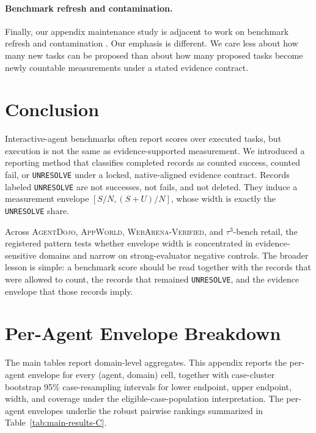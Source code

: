 \documentclass{article}
\newcommand{\agentdojo}{\textsc{AgentDojo}\xspace}
\newcommand{\appworld}{\textsc{AppWorld}\xspace}
\newcommand{\webarena}{\textsc{WebArena-Verified}\xspace}
\newcommand{\tauthree}{\(\tau^3\)-bench retail\xspace}
\begin{document}
\paragraph{Benchmark refresh and contamination.}
Finally, our appendix maintenance study is adjacent to work on benchmark
refresh and contamination \citep{kiela2021dynabench, guan2025benchmark,
yang2023rethinkingcontamination}. Our emphasis is different. We care less about
how many new tasks can be proposed than about how many proposed tasks become
newly countable measurements under a stated evidence contract.

\section{Conclusion}

Interactive-agent benchmarks often report scores over executed tasks, but
execution is not the same as evidence-supported measurement. We introduced a
reporting method that classifies completed records as counted success, counted
fail, or \texttt{UNRESOLVE} under a locked, native-aligned evidence contract.
Records labeled \texttt{UNRESOLVE} are not successes, not fails, and not
deleted. They induce a measurement envelope \([S/N,(S+U)/N]\), whose width is
exactly the \texttt{UNRESOLVE} share.

Across \agentdojo, \appworld, \webarena, and \tauthree, the registered pattern
tests whether envelope width is concentrated in evidence-sensitive domains and
narrow on strong-evaluator negative controls. The broader lesson is simple: a
benchmark score should be read together with the records that were allowed to
count, the records that remained \texttt{UNRESOLVE}, and the evidence envelope
that those records imply.

\clearpage



\clearpage
\appendix

\section{Per-Agent Envelope Breakdown}
\label{app:per-agent}

The main tables report domain-level aggregates. This appendix reports the
per-agent envelope for every (agent, domain) cell, together with case-cluster
bootstrap 95\% case-resampling intervals for lower endpoint, upper endpoint,
width, and coverage under the eligible-case-population interpretation. The
per-agent envelopes underlie the robust pairwise rankings summarized in
Table~\ref{tab:main-results-C}.
\end{document}
